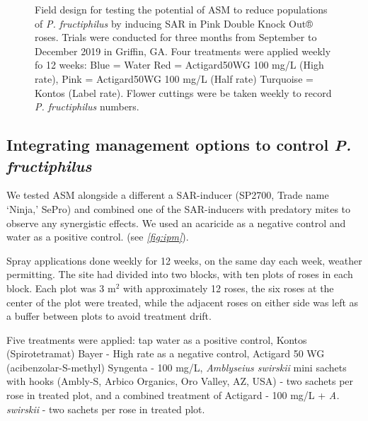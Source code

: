 \documentclass[12pt,final,CPage]{ufthesis}
\begin{document}
{\begin{figure}
{  }

  \caption[Field design for testing the potential of ASM to reduce populations of \textit{P. fructiphilus}]{Field design for testing the potential of ASM to reduce populations of \textit{P. fructiphilus} by inducing SAR in Pink Double Knock Out® roses. Trials were conducted for three months from September to December 2019 in Griffin, GA. Four treatments were applied weekly fo 12 weeks: Blue = Water Red = Actigard50WG 100 \si{\milli\gram}/L (High rate),  Pink = Actigard50WG 100 \si{\milli\gram}/L (Half rate) Turquoise = Kontos (Label rate). Flower cuttings were be taken weekly to record \textit{P. fructiphilus} numbers.}\label{fig:unnamed-chunk-2}
  \end{figure}
  \hypertarget{ipm-trials}{%
  \subsection{\texorpdfstring{Integrating management options to control \emph{P. fructiphilus}}{Integrating management options to control P. fructiphilus}}\label{ipm-trials}}

  We tested ASM alongside a different a SAR-inducer (SP2700, Trade name `Ninja,' SePro) and combined one of the SAR-inducers with predatory mites to observe any synergistic effects. We used an acaricide as a negative control and water as a positive control. (see \emph{\ref{fig:ipm}}).

  Spray applications done weekly for 12 weeks, on the same day each week, weather permitting.
  The site had divided into two blocks, with ten plots of roses in each block. Each plot was 3 \si{m}\(^2\) with approximately 12 roses, the six roses at the center of the plot were treated, while the adjacent roses on either side was left as a buffer between plots to avoid treatment drift.

  Five treatments were applied: tap water as a positive control, Kontos (Spirotetramat) Bayer - High rate as a negative control, Actigard 50 WG (acibenzolar-S-methyl) Syngenta - 100 \si{\milli\gram}/\si{\liter}, \emph{Amblyseius swirskii} mini sachets with hooks (Ambly-S, Arbico Organics, Oro Valley, AZ, USA) - two sachets per rose in treated plot, and a combined treatment of Actigard - 100 \si{\milli\gram}/\si{\liter} + \emph{A. swirskii} - two sachets per rose in treated plot.

}
\end{document}
